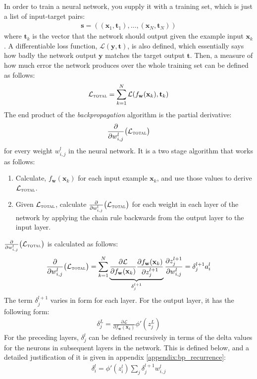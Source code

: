 \documentclass[a4paper, 12pt]{report}
\newcommand{\tit}[1]{\textit{#1}}
\begin{document}
In order to train a neural network, you supply it with a training set, which is just a list of input-target pairs:
\begin{gather*}
	\mathbf{s} = ((\mathbf{x}_1, \mathbf{t}_1), ..., (\mathbf{x}_N, \mathbf{t}_N))
\end{gather*}
where $\mathbf{t}_k$ is the vector that the network should output given the example input $\mathbf{x}_k$. A differentiable loss function, $\mathcal{L}(\mathbf{y}, \mathbf{t})$, is also defined, which essentially says how badly the network output $\mathbf{y}$ matches the target output $\mathbf{t}$. Then, a measure of how much error the network produces over the whole training set can be defined as follows:
\begin{gather}
	\mathcal{L}_{\text{\scshape total}} = \sum_{k = 1}^N \mathcal{L}(f_{\mathbf{w}}(\mathbf{x}_k), \mathbf{t}_k)
\end{gather}
The end product of the \tit{backpropagation} algorithm is the partial derivative:
\begin{gather*}
	\frac{\partial}{\partial w_{i,j}^l} \big( \mathcal{L}_{\text{\scshape total}} \big)
\end{gather*}
for every weight $w_{i,j}^l$ in the neural network. It is a two stage algorithm that works as follows:
\begin{enumerate}
\item
	Calculate, $f_{\mathbf{w}}(\mathbf{x}_k)$ for each input example $\mathbf{x}_k$, and use those values to derive $\mathcal{L}_{\text{\scshape total}}$.
\item
	Given $\mathcal{L}_{\text{\scshape total}}$, calculate $\frac{\partial}{\partial w_{i,j}^l} \big( \mathcal{L}_{\text{\scshape total}} \big)$ for each weight in each layer of the network by applying the chain rule backwards from the output layer to the input layer.
\end{enumerate}

$\frac{\partial}{\partial w_{i,j}^l} \big( \mathcal{L}_{\text{\scshape total}} \big)$ is calculated as follows:
\begin{gather} \label{eq:bp_weight_grad}
	\frac{\partial}{\partial w_{i,j}^l} \big( \mathcal{L}_{\text{\scshape total}} \big) = \sum_{k = 1}^N \underbrace{\frac{\partial \mathcal{L}}{\partial f_{\mathbf{w}}(\mathbf{x}_k)}  \frac{\partial f_{\mathbf{w}}(\mathbf{x}_k)}{\partial z_j^{l + 1}}}_{\delta_j^{l+1}}  \frac{\partial z_j^{l + 1}}{\partial w_{i,j}^l} = \delta_j^{l+1} a_i^l
\end{gather}
The term $\delta_j^{l+1}$ varies in form for each layer. For the output layer, it has the following form:
\begin{gather} \label{eq:delta_output}
	\delta_j^L = \frac{\partial \mathcal{L}}{\partial f_{\mathbf{w}}(\mathbf{x}_k)} \phi'(z_j^L)
\end{gather}
For the preceding layers, $\delta_j^l$ can be defined recursively in terms of the delta values for the neurons in subsequent layers in the network. This is defined below, and a detailed justification of it is given in appendix \ref{appendix:bp_recurrence}:
\begin{gather} \label{eq:delta_hidden}
	\delta_i^l = \phi'(z_i^l) \sum_j \delta_j^{l+1} w_{i,j}^l
\end{gather}
\end{document}
